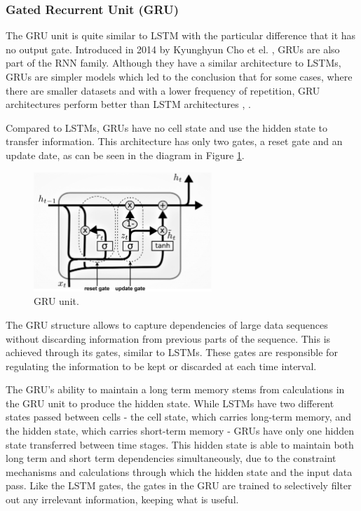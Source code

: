 \subsubsection{Gated Recurrent Unit (GRU)}\label{chap3:subsubsec:gru}

The \ac{GRU} unit is quite similar to \ac{LSTM} with the particular difference that it has no output gate. Introduced in 2014 by Kyunghyun Cho et el. \cite{gru0}, \ac{GRU}s are also part of the \ac{RNN} family. Although they have a similar architecture to \ac{LSTM}s, \ac{GRU}s are simpler models which led to the conclusion that for some cases, where there are smaller datasets and with a lower frequency of repetition, \ac{GRU} architectures perform better than \ac{LSTM} architectures \cite{gru1}, \cite{gru2}.

Compared to \ac{LSTM}s, \ac{GRU}s have no cell state and use the hidden state to transfer information. This architecture has only two gates, a reset gate and an update date, as can be seen in the diagram in Figure \ref{gru}.


\begin{figure}[h!]
    \centering
    \begin{center}
    \includegraphics[width=0.6\textwidth]{Images/GRU_cell_detailed.png}
    \caption{GRU unit.}
    \label{gru}
    \end{center}
\end{figure}


The \ac{GRU} structure allows to capture dependencies of large data sequences without discarding information from previous parts of the sequence. This is achieved through its gates, similar to \ac{LSTM}s. These gates are responsible for regulating the information to be kept or discarded at each time interval.

The \ac{GRU}'s ability to maintain a long term memory stems from calculations in the \ac{GRU} unit to produce the hidden state. While \ac{LSTM}s have two different states passed between cells - the cell state, which carries long-term memory, and the hidden state, which carries short-term memory - \ac{GRU}s have only one hidden state transferred between time stages. This hidden state is able to maintain both long term and short term dependencies simultaneously, due to the constraint mechanisms and calculations through which the hidden state and the input data pass.  Like the \ac{LSTM} gates, the gates in the \ac{GRU} are trained to selectively filter out any irrelevant information, keeping what is useful.

